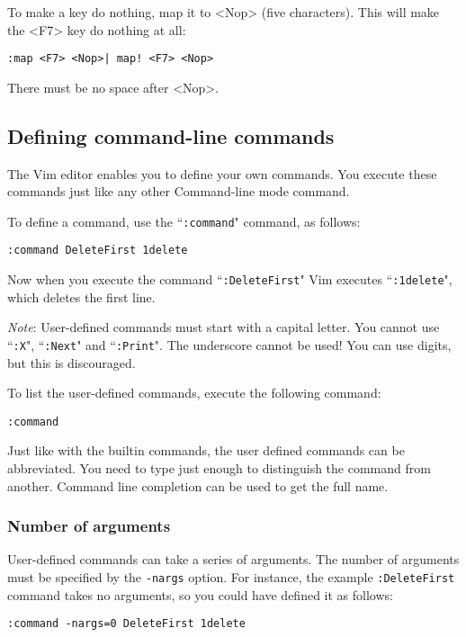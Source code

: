 To make a key do nothing, map it to <Nop> (five characters).
This will make the <F7> key do nothing at all:

\begin{Verbatim}[samepage=true]
 :map <F7> <Nop>| map! <F7> <Nop>
\end{Verbatim}

There must be no space after <Nop>.
\subsection{Defining command-line commands}
The Vim editor enables you to define your own commands.
You execute these commands just like any other Command-line mode command.

To define a command, use the ``\texttt{:command}" command, as follows:

\begin{Verbatim}[samepage=true]
 :command DeleteFirst 1delete
\end{Verbatim}

Now when you execute the command ``\texttt{:DeleteFirst}" Vim executes ``\texttt{:1delete}", which deletes the first line.

\emph{Note}: User-defined commands must start with a capital letter.
You cannot use ``\texttt{:X}", ``\texttt{:Next}" and ``\texttt{:Print}".
The underscore cannot be used!  You can use digits, but this is discouraged.

To list the user-defined commands, execute the following command:

\begin{Verbatim}[samepage=true]
 :command
\end{Verbatim}

Just like with the builtin commands, the user defined commands can be abbreviated.
You need to type just enough to distinguish the command from another.
Command line completion can be used to get the full name.

\subsubsection{Number of arguments}
User-defined commands can take a series of arguments.
The number of arguments must be specified by the \texttt{-nargs} option.
For instance, the example \texttt{:DeleteFirst} command takes no arguments, so you could have defined it as follows:

\begin{Verbatim}[samepage=true]
 :command -nargs=0 DeleteFirst 1delete
\end{Verbatim}

